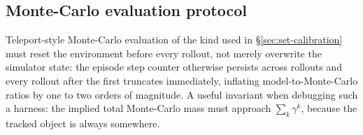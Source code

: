 \documentclass{article}
\begin{document}
\subsection{Monte-Carlo evaluation protocol}
\label{app:mc}

Teleport-style Monte-Carlo evaluation of the kind used in
\S\ref{sec:set-calibration} must reset the environment before every rollout,
not merely overwrite the simulator state: the episode step counter otherwise
persists across rollouts and every rollout after the first truncates
immediately, inflating model-to-Monte-Carlo ratios by one to two orders of
magnitude. A useful invariant when debugging such a harness: the implied total
Monte-Carlo mass must approach $\sum_k\gamma^k$, because the tracked object is
always somewhere.
\end{document}
